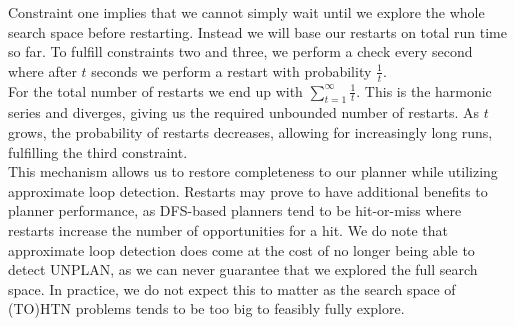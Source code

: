 Constraint one implies that we cannot simply wait until we explore the whole search space before restarting. Instead we will base our restarts on total run time so far. To fulfill constraints two and three, we perform a check every second where after $t$ seconds we perform a restart with probability $\frac{1}{t}$. \\
For the total number of restarts we end up with $\sum_{t = 1}^\infty \frac{1}{t}$. This is the harmonic series and diverges, giving us the required unbounded number of restarts. As $t$ grows, the probability of restarts decreases, allowing for increasingly long runs, fulfilling the third constraint. \\
This mechanism allows us to restore completeness to our planner while utilizing approximate loop detection. Restarts may prove to have additional benefits to planner performance, as DFS-based planners tend to be hit-or-miss where restarts increase the number of opportunities for a hit. We do note that approximate loop detection does come at the cost of no longer being able to detect UNPLAN, as we can never guarantee that we explored the full search space. In practice, we do not expect this to matter as the search space of (TO)HTN problems tends to be too big to feasibly fully explore.
\begin{comment}
- false positives mean we loose completeness
- i.e. if we perform progression search and $p = p_0, \ldots, p_n$ defines a path of search nodes from initial node to goal
- then for any $p_i$ in $p$, search nodes $p_0, \ldots, p_{i-1}$ may collectively set the $k$ hashes produced by $p_i$, filtering it out
- the chance of all paths to a goal node being filtered out as false positives only increases with each path we wrongly explore
- overall, we loose completeness

- one way to get completeness back: restarts while changing the seeds of the hash function
- assuming perfect hashing, for different seeds our hashes are completely uncorrelated
- as the number of restarts increases, the chance of encountering a false positive on the path start - goal every single time goes to zero
- only an infinite number of restarts as runtime goes to infinity does guarantee us this property
- we need arbitrarily long runs in between restarts, as plans may be arbitrarily long
- to be precise, we could limit plan length by the combination of maximum depth before a plan must exist (if it does at all) and maximum expansion factor (i.e. max. number of children of any task)
- simply allowing runs of any length simplifies the implementation, though
- we choose to check for a restart each second and, at second $t$, do it with probability $1 / t$
- for expected number of restarts we get $\sum_{t=1}^{\infty} \frac{1}{t}$
- this is a geometric series which diverges
- average time between restarts increases as time progresses
- both properties are what we want!
\end{comment}

